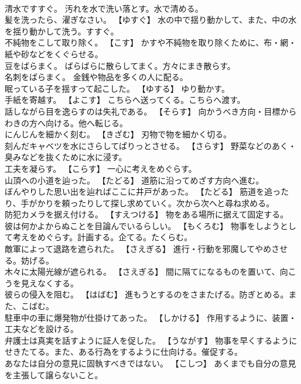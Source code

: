 \documentclass[8pt]{extreport}
\begin{document}
\begin{CJK}{UTF8}{min}
\\	清水ですすぐ。	汚れを水で洗い落とす。水で清める。
\\	髪を洗ったら、濯ぎなさい。	【ゆすぐ】 水の中で揺り動かして、また、中の水を揺り動かして洗う。すすぐ。
\\	不純物をこして取り除く。	【こす】 かすや不純物を取り除くために、布・網・紙や砂などをくぐらせる。
\\	豆をばらまく。	ばらばらに散らしてまく。方々にまき散らす。
\\	名刺をばらまく。	金銭や物品を多くの人に配る。
\\	眠っている子を揺すって起こした。	【ゆする】 ゆり動かす。
\\	手紙を寄越す。	【よこす】 こちらへ送ってくる。こちらへ渡す。
\\	話しながら目を逸らすのは失礼である。	【そらす】 向かうべき方向・目標からわきの方へ向ける。他へ転じる。
\\	にんじんを細かく刻む。	【きざむ】 刃物で物を細かく切る。
\\	刻んだキャベツを水にさらしてぱりっとさせる。	【さらす】 野菜などのあく・臭みなどを抜くために水に浸す。
\\	工夫を凝らす。	【こらす】 一心に考えをめぐらす。
\\	山頂への小道を辿った。	【たどる】 道筋に沿ってめざす方向へ進む。
\\	ぼんやりした思い出を辿ればここに井戸があった。	【たどる】 筋道を追ったり、手がかりを頼ったりして探し求めていく。次から次へと尋ね求める。
\\	防犯カメラを据え付ける。	【すえつける】 物をある場所に据えて固定する。
\\	彼は何かよからぬことを目論んでいるらしい。	【もくろむ】 物事をしようとして考えをめぐらす。計画する。企てる。たくらむ。
\\	敵軍によって退路を遮られた。	【さえぎる】 進行・行動を邪魔してやめさせる。妨げる。
\\	木々に太陽光線が遮られる。	【さえぎる】 間に隔てになるものを置いて、向こうを見えなくする。
\\	彼らの侵入を阻む。	【はばむ】 進もうとするのをさまたげる。防ぎとめる。また、こばむ。
\\	駐車中の車に爆発物が仕掛けてあった。	【しかける】 作用するように、装置・工夫などを設ける。
\\	弁護士は真実を話すように証人を促した。	【うながす】 物事を早くするようにせきたてる。また、ある行為をするように仕向ける。催促する。
\\	あなたは自分の意見に固執すべきではない。	【こしつ】 あくまでも自分の意見を主張して譲らないこと。

\end{CJK}
\end{document}
